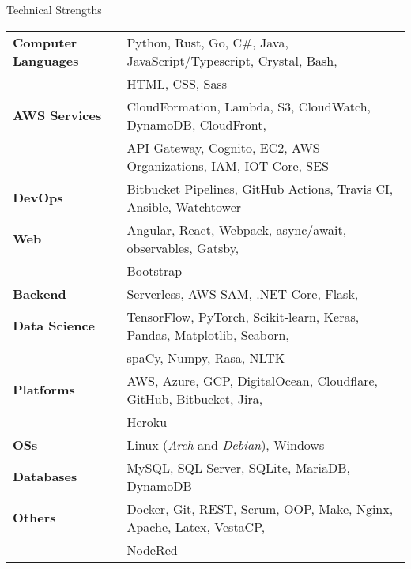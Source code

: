 \documentclass{resume} %
\begin{document}
\begin{rSection}{Technical Strengths}

\begin{tabular}{ @{} >{\bfseries}l @{\hspace{4ex}} l }
Computer Languages & Python, Rust, Go, C\#, Java, JavaScript/Typescript, Crystal, Bash, \\
                   & HTML, CSS, Sass \\
AWS Services       & CloudFormation, Lambda, S3, CloudWatch, DynamoDB, CloudFront, \\
                   & API Gateway, Cognito, EC2, AWS Organizations, IAM, IOT Core, SES \\
DevOps             & Bitbucket Pipelines, GitHub Actions, Travis CI, Ansible, Watchtower \\
Web                & Angular, React, Webpack, async/await, observables, Gatsby, \\
                   & Bootstrap \\
Backend            & Serverless, AWS SAM, .NET Core, Flask,  \\
Data Science       & TensorFlow, PyTorch, Scikit-learn, Keras, Pandas, Matplotlib, Seaborn, \\
                   & spaCy, Numpy, Rasa, NLTK \\
Platforms          & AWS, Azure, GCP, DigitalOcean, Cloudflare, GitHub, Bitbucket, Jira, \\
                   & Heroku \\
OSs                & Linux (\textit{Arch} and \textit{Debian}), Windows \\
Databases          & MySQL, SQL Server, SQLite, MariaDB, DynamoDB \\
Others             & Docker, Git, REST, Scrum, OOP, Make, Nginx, Apache, Latex, VestaCP, \\
                   & NodeRed \\ 
\end{tabular}

\end{rSection}

\end{document}
